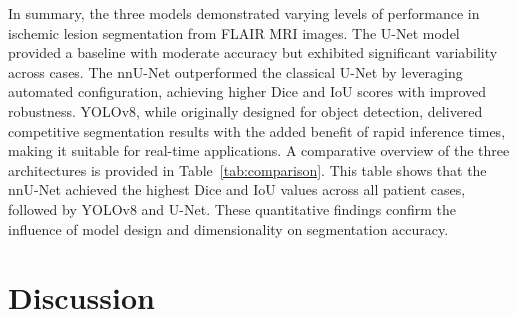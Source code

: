 \documentclass[12pt]{article}
\begin{document}
In summary, the three models demonstrated varying levels of performance in ischemic lesion segmentation from FLAIR MRI images. The U-Net model provided a baseline with moderate accuracy but exhibited significant variability across cases. The nnU-Net outperformed the classical U-Net by leveraging automated configuration, achieving higher Dice and IoU scores with improved robustness. YOLOv8, while originally designed for object detection, delivered competitive segmentation results with the added benefit of rapid inference times, making it suitable for real-time applications. A comparative overview of the three architectures is provided in Table~\ref{tab:comparison}. This table shows that the nnU-Net achieved the highest Dice and IoU values across all patient cases, followed by YOLOv8 and U-Net. These quantitative findings confirm the influence of model design and dimensionality on segmentation accuracy.

\begin{table}[tp]
\centering
{}
\caption{Comparison of segmentation models on the test set (N=25). The nnU-Net achieved the highest Dice and IoU scores, indicating superior segmentation accuracy and robustness. YOLOv8 provided competitive performance with efficient inference, while U-Net showed limited generalization capabilities.}
\label{tab:comparison}
\end{table}

\section{Discussion}\label{sec:discussion}

\end{document}
